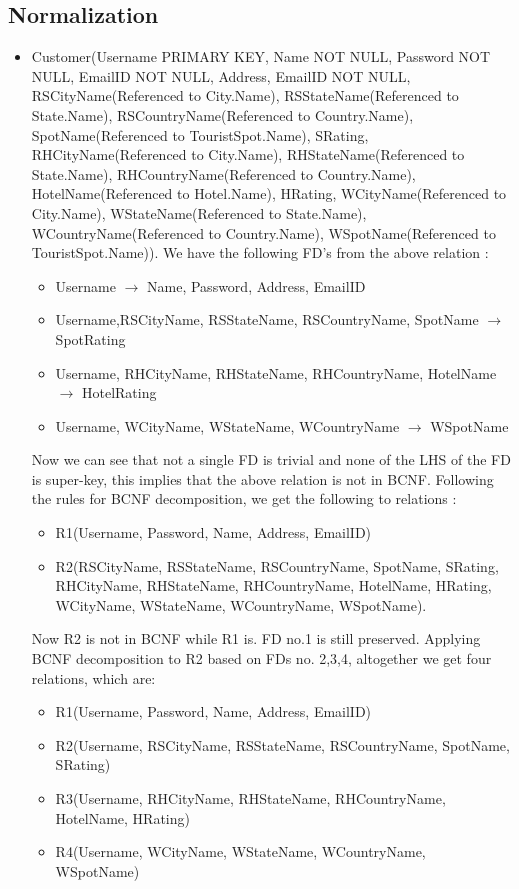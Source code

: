 \documentclass[a4paper,11pt]{article}
\begin{document}
\subsection{Normalization}
\begin{itemize}
\item Customer(Username PRIMARY KEY, Name NOT NULL, Password NOT NULL, EmailID NOT NULL, Address, EmailID NOT NULL, RSCityName(Referenced to City.Name), RSStateName(Referenced to State.Name), RSCountryName(Referenced to Country.Name), SpotName(Referenced to TouristSpot.Name), SRating, RHCityName(Referenced to City.Name), RHStateName(Referenced to State.Name), RHCountryName(Referenced to Country.Name), HotelName(Referenced to Hotel.Name), HRating, WCityName(Referenced to City.Name), WStateName(Referenced to State.Name), WCountryName(Referenced to Country.Name), WSpotName(Referenced to TouristSpot.Name)). \newline \newline
We have the following FD’s from the above relation :
\begin{itemize}
\item Username $\rightarrow$ Name, Password, Address, EmailID
\item Username,RSCityName, RSStateName, RSCountryName, SpotName $\rightarrow$ SpotRating
\item Username, RHCityName, RHStateName, RHCountryName, HotelName $\rightarrow$ HotelRating
\item Username, WCityName, WStateName, WCountryName $\rightarrow$ WSpotName
\end{itemize}
Now we can see that not a single FD is trivial and none of the LHS of the FD is super-key, this implies that the above relation is not in BCNF. Following the rules for BCNF decomposition, we get the following to relations :
\begin{itemize}
\item R1(Username, Password, Name, Address, EmailID)
\item R2(RSCityName, RSStateName, RSCountryName, SpotName, SRating, RHCityName, RHStateName, RHCountryName, HotelName, HRating, WCityName, WStateName, WCountryName, WSpotName).
\end{itemize}
Now R2 is not in BCNF while R1 is. FD no.1 is still preserved. Applying BCNF decomposition to R2 based on FDs no. 2,3,4, altogether we get four relations, which are:
\begin{itemize}
\item R1(Username, Password, Name, Address, EmailID)
\item R2(Username, RSCityName, RSStateName, RSCountryName, SpotName, SRating)
\item R3(Username, RHCityName, RHStateName, RHCountryName, HotelName, HRating)
\item R4(Username, WCityName, WStateName, WCountryName, WSpotName)
\end{itemize}


\end{itemize}
\end{document}
